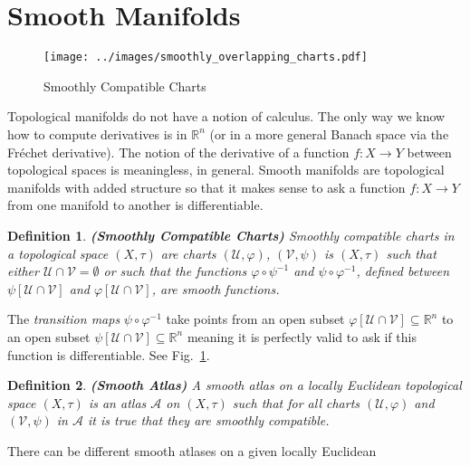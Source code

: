 \documentclass{article}
\theoremstyle{plain}
\theoremstyle{normal}
\newtheorem{definition}{Definition}[section]
\begin{document}
    \section{Smooth Manifolds}
        \begin{figure}
            \centering
            \texttt{[image: ../images/smoothly\_overlapping\_charts.pdf]}
            \caption{Smoothly Compatible Charts}
            \label{fig:smoothly_overlapping_charts}
        \end{figure}
        Topological manifolds do not have a notion of calculus. The only way
        we know how to compute derivatives is in $\mathbb{R}^{n}$
        (or in a more general Banach space via the Fr\'{e}chet derivative).
        The notion of the derivative of a function
        $f:X\rightarrow{Y}$ between topological spaces is meaningless, in
        general. Smooth manifolds are topological manifolds with added structure
        so that it makes sense to ask a function
        $f:X\rightarrow{Y}$ from one manifold to another is differentiable.
        \begin{definition}{\textbf{(Smoothly Compatible Charts)}}
            Smoothly compatible charts in a topological space
            $(X,\tau)$ are charts $(\mathcal{U},\varphi)$,
            $(\mathcal{V},\psi)$ is $(X,\tau)$ such that either
            $\mathcal{U}\cap\mathcal{V}=\emptyset$ or such that the functions
            $\varphi\circ\psi^{-1}$ and $\psi\circ\varphi^{-1}$, defined between
            $\psi[\mathcal{U}\cap\mathcal{V}]$ and
            $\varphi[\mathcal{U}\cap\mathcal{V}]$, are smooth functions.
        \end{definition}
        The \textit{transition maps} $\psi\circ\varphi^{-1}$ take points from
        an open subset
        $\varphi[\mathcal{U}\cap\mathcal{V}]\subseteq\mathbb{R}^{n}$ to an
        open subset $\psi[\mathcal{U}\cap\mathcal{V}]\subseteq\mathbb{R}^{n}$
        meaning it is perfectly valid to ask if this function is differentiable.
        See Fig.~\ref{fig:smoothly_overlapping_charts}.
        \begin{definition}{\textbf{(Smooth Atlas)}}
            A smooth atlas on a locally Euclidean topological space
            $(X,\tau)$ is an atlas $\mathcal{A}$ on $(X,\tau)$ such that for
            all charts $(\mathcal{U},\varphi)$ and $(\mathcal{V},\psi)$ in
            $\mathcal{A}$ it is true that they are smoothly compatible.
        \end{definition}
        There can be different smooth atlases on a given locally Euclidean
\end{document}
